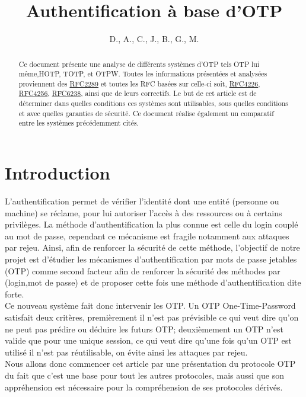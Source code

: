 \documentclass{../res/univ-projet}
\title{Authentification à base d'OTP}
\author{D.\bsc{Picard}, A.\bsc{Smondack}, C.\bsc{Hardouin}, J.\bsc{Tayewo}, B.\bsc{Zigh}, G.\bsc{Ferry}, M.\bsc{Michotte} }
\begin{document}
\maketitle

\begin{abstract}
Ce document présente une analyse de différents systèmes d'OTP tels \og{}OTP\fg{} lui même,\og{}HOTP\fg{}, \og{}TOTP\fg{},
et \og{}OTPW\fg{}. Toutes les informations présentées et analysées proviennent des \href{http://tools.ietf.org/html/rfc2289}{RFC2289} et 
toutes les RFC basées sur celle-ci soit, \href{http://tools.ietf.org/html/rfc4226}{RFC4226}, \href{http://tools.ietf.org/html/rfc4256}{RFC4256}, 
\href{http://tools.ietf.org/html/rfc6238}{RFC6238}, ainsi que de leurs correctifs. Le but de cet article est de déterminer dans quelles conditions 
ces systèmes sont utilisables, sous quelles conditions et avec quelles garanties de sécurité. Ce document réalise également un comparatif entre les 
systèmes précédemment cités.
\end{abstract}

\newpage
\tableofcontents
\newpage
\part{Introduction}
L'authentification permet de vérifier l'identité dont une entité (personne ou machine) se réclame, pour lui autoriser l'accès à des
ressources ou à certains privilèges. La méthode d'authentification la plus connue est celle du login couplé au mot de passe, cependant
ce mécanisme est fragile notamment aux attaques par rejeu. Ainsi, afin de renforcer la sécurité de cette méthode, 
l'objectif de notre projet est d'étudier les mécanismes d'authentification par mots de passe jetables (OTP) comme second facteur afin de renforcer la sécurité
des méthodes par (login,mot de passe) et de proposer cette fois une méthode d'authentification dite forte.\\
Ce nouveau système fait donc intervenir les OTP. Un OTP One-Time-Password satisfait deux critères, premièrement il n'est pas prévisible ce qui veut dire qu'on ne peut pas prédire 
ou déduire les futurs OTP; deuxièmement un OTP n'est valide que pour une unique session, ce qui veut dire qu'une fois qu'un OTP est utilisé il n'est pas réutilisable, on évite ainsi les
attaques par rejeu.\\
Nous allons donc commencer cet article par une présentation du protocole OTP du fait que c'est une base pour tout les autres protocoles, mais aussi que son appréhension est nécessaire pour la compréhension
de ses protocoles dérivés.
\setcounter{section}{0}
\end{document}
